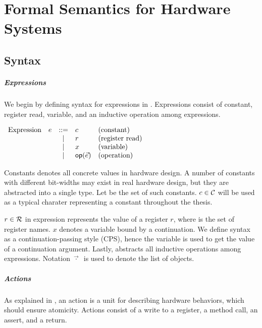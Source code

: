 \chapter{Formal Semantics for Hardware Systems}

\section{Syntax}

\paragraph{Expressions}
We begin by defining syntax for expressions in \Kami{}. Expressions
consist of constant, register read, variable, and an inductive
operation among expressions.

\begin{center}
  \begin{math}
    \begin{array}{rcll}
      \textrm{Expression}\quad e & ::= & c & \textrm{(constant)} \\
      & | & r & \textrm{(register read)} \\
      & | & x & \textrm{(variable)} \\
      & | & \textsf{op}(\vec{e}) & \textrm{(operation)} \\
    \end{array}
  \end{math}
\end{center}

Constants denotes all concrete values in hardware design. A number of
constants with different bit-widths may exist in real hardware design,
but they are abstracted into a single type. Let \setconst{} be the set
of such constants. $c \in \mathcal{C}{}$ will be used as a typical
charater representing a constant throughout the thesis.

$r \in \mathcal{R}{}$ in expression represents the value of a register
$r$, where \setregs{} is the set of register names. $x$ denotes a
variable bound by a continuation. We define syntax as a
continuation-passing style (CPS), hence the variable is used to get
the value of a continuation argument. Lastly,  abstracts all
inductive operations among expressions. Notation $\vec{\cdot}\ $ is
used to denote the list of objects.

\paragraph{Actions}
As explained in , an action is a unit for describing
hardware behaviors, which should ensure atomicity. Actions consist of
a write to a register, a method call, an assert, and a return.

